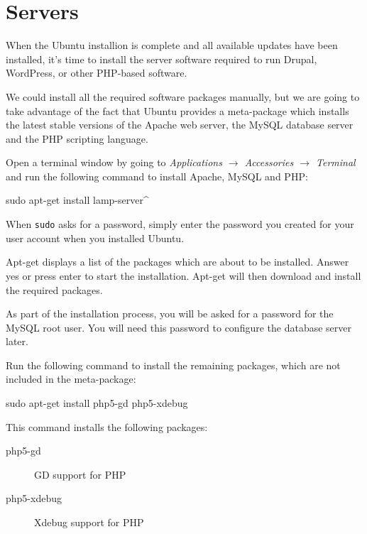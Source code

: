\documentclass[draft,ebook,10pt,twoside,openright]{memoir}
\begin{document}
\chapter{Servers} \label{chservers}

\noindent
When the Ubuntu installion is complete and all available updates have been installed, it’s time to install the server software required to run Drupal, WordPress, or other PHP-based software.

We could install all the required software packages manually, but we are going to take advantage of the fact that Ubuntu provides a meta-package which installs the latest stable versions of the Apache web server, the MySQL database server and the PHP scripting language.

Open a terminal window by going to \emph{Applications $\rightarrow$ Accessories $\rightarrow$ Terminal} and run the following command to install Apache, MySQL and PHP:

\begin{squashboxcommand}
sudo apt-get install lamp-server^
\end{squashboxcommand}

When \verb!sudo! asks for a password, simply enter the password you created for your user account when you installed Ubuntu.

Apt-get displays a list of the packages which are about to be installed. Answer yes or press enter to start the installation. Apt-get will then download and install the required packages.
  
As part of the installation process, you will be asked for a password for the MySQL root user. You will need this password to configure the database server later.

Run the following command to install the remaining packages, which are not included in the meta-package:

\begin{squashboxcommand}
sudo apt-get install php5-gd php5-xdebug
\end{squashboxcommand}

This command installs the following packages:

\begin{description}
\item[php5-gd] GD support for PHP
\item[php5-xdebug] Xdebug support for PHP
\end{description}
\end{document}
